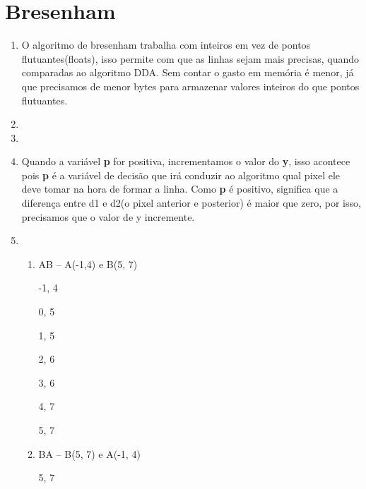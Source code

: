 \section*{Bresenham}

\begin{question}

	\begin{enumerate}\addtocounter{enumi}{10}
	
		\item O algoritmo de bresenham trabalha com inteiros em vez de pontos flutuantes(floats),
		isso permite com que as linhas sejam mais precisas, quando comparadas ao algoritmo DDA.
		Sem contar o gasto em memória é menor, já que precisamos de menor bytes para armazenar 	       valores inteiros do que pontos flutuantes.
		
		\item 

		\item 

		\item 
		Quando a variável \textbf{p} for positiva, incrementamos o valor do \textbf{y},
		isso acontece pois \textbf{p} é a variável de decisão que irá conduzir ao algoritmo
		qual pixel ele deve tomar na hora de formar a linha. Como \textbf{p} é positivo, 
		significa que a diferença entre d1 e d2(o pixel anterior e posterior) é maior que zero,
		por isso, precisamos que o valor de y incremente.

        \item \begin{enumerate}[label=\alph*.]
				   \setlength\itemsep{1em}
					\item	 AB – A(-1,4) e B(5, 7)
					   				
                       -1, 4
                       
                        0, 5
                        
                        1, 5
                        
                       2, 6
                       
                       3, 6
                       
                       4, 7
                       
                        5, 7
					
					\item    BA – B(5, 7) e A(-1, 4)
					
                           5, 7
                           

\end{enumerate}
\end{enumerate}
\end{question}
